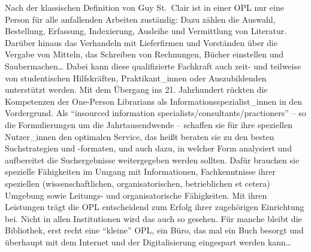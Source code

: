 \documentclass[a4paper,
fontsize=11pt,
oneside,
numbers=noperiodatend,
parskip=half-,
bibliography=totoc,
final
]{scrartcl}
\begin{document}
Nach der klassischen Definition von Guy St.~Clair ist in einer OPL nur
eine Person für alle anfallenden Arbeiten zuständig: Dazu zählen die
Auswahl, Bestellung, Erfassung, Indexierung, Ausleihe und Vermittlung
von Literatur. Darüber hinaus das Verhandeln mit Lieferfirmen und
Vorständen über die Vergabe von Mitteln, das Schreiben von Rechnungen,
Bücher einstellen und Saubermachen\ldots{} Dabei kann diese
qualifizierte Fachkraft auch zeit- und teilweise von studentischen
Hilfskräften, Praktikant\_innen oder Auszubildenden unterstützt werden.
Mit dem Übergang ins 21. Jahrhundert rückten die Kompetenzen der
One-Person Librarians als Informationsspezialist\_innen in den
Vordergrund. Als \enquote{insourced information
specialists/consultants/practioners} -- so die Formulierungen um die
Jahrtausendwende -- schaffen sie für ihre speziellen Nutzer\_innen den
optimalen Service, das heißt beraten sie zu den besten Suchstrategien
und -formaten, und auch dazu, in welcher Form analysiert und aufbereitet
die Suchergebnisse weitergegeben werden sollten. Dafür brauchen sie
spezielle Fähigkeiten im Umgang mit Informationen, Fachkenntnisse ihrer
speziellen (wissenschaftlichen, organisatorischen, betrieblichen et
cetera) Umgebung sowie Leitungs- und organisatorische Fähigkeiten. Mit
ihren Leistungen trägt die OPL entscheidend zum Erfolg ihrer zugehörigen
Einrichtung bei. Nicht in allen Institutionen wird das auch so gesehen.
Für manche bleibt die Bibliothek, erst recht eine \enquote{kleine} OPL,
ein Büro, das mal ein Buch besorgt und überhaupt mit dem Internet und
der Digitalisierung eingespart werden kann\ldots{}
\end{document}
